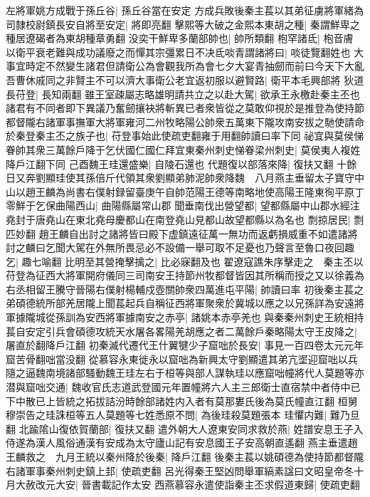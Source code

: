 左將軍姚方成戰于孫丘谷|{
	孫丘谷當在安定}
方成兵敗後秦主萇以其弟征虜將軍緒為司隸校尉鎮長安自將至安定|{
	將即亮翻}
擊熙等大破之金熙本東胡之種|{
	秦謂鮮卑之種居遼碣者為東胡種章勇翻}
没奕干鮮卑多蘭部帥也|{
	帥所類翻}
枹罕諸氐|{
	枹音膚}
以衛平衰老難與成功議廢之而憚其宗彊累日不决氐啖青謂諸將曰|{
	啖徒覽翻姓也}
大事宜時定不然變生諸君但請衛公為會觀我所為會七夕大宴青抽劒而前曰今天下大亂吾曹休戚同之非賢主不可以濟大事衛公老宜返初服以避賢路|{
	衛平本毛興部將}
狄道長苻登|{
	長知兩翻}
雖王室疎屬志略雄明請共立之以赴大駕|{
	欲承王永檄赴秦主丕也}
諸君有不同者即下異議乃奮劒攘袂將斬異已者衆皆從之莫敢仰視於是推登為使持節都督隴右諸軍事撫軍大將軍雍河二州牧略陽公帥衆五萬東下隴攻南安拔之馳使請命於秦登秦主丕之族子也|{
	苻登事始此使疏吏翻雍于用翻帥讀曰率下同}
祕宜與莫侯悌眷帥其衆三萬餘戶降于乞伏國仁國仁拜宜東秦州刺史悌眷梁州刺史|{
	莫侯夷人複姓降戶江翻下同}
己酉魏王珪還盛樂|{
	自陵石還也}
代題復以部落來降|{
	復扶又翻}
十餘日又奔劉顯珪使其孫倍斤代領其衆劉顯弟肺泥帥衆降魏　八月燕主垂留太子寶守中山以趙王麟為尚書右僕射録留臺庚午自帥范陽王德等南略地使高陽王隆東徇平原丁零鮮于乞保曲陽西山|{
	曲陽縣屬常山郡}
聞垂南伐出營望都|{
	望都縣屬中山郡水經注堯封于唐堯山在東北堯母慶都山在南登堯山見都山故望都縣以為名也}
剽掠居民|{
	剽匹妙翻}
趙王麟自出討之諸將皆曰殿下虚鎮遠征萬一無功而返虧損威重不如遣諸將討之麟曰乞聞大駕在外無所畏忌必不設備一舉可取不足憂也乃聲言至魯口夜回趣乞|{
	趣七喻翻}
比明至其營掩擊擒之|{
	比必寐翻及也}
翟遼寇譙朱序擊走之　秦主丕以苻登為征西大將軍開府儀同三司南安王持節州牧都督皆因其所稱而授之又以徐義為右丞相留王騰守晉陽右僕射楊輔戍壺關帥衆四萬進屯平陽|{
	帥讀曰率}
初後秦主萇之弟碩德統所部羌居隴上聞萇起兵自稱征西將軍聚衆於冀城以應之以兄孫詳為安遠將軍據隴城從孫訓為安西將軍據南安之赤亭|{
	諸姚本赤亭羌也}
與秦秦州刺史王統相持萇自安定引兵會碩德攻統天水屠各畧陽羌胡應之者二萬餘戶秦略陽太守王皮降之|{
	屠直於翻降戶江翻}
初秦滅代遷代王什翼犍少子窟咄於長安|{
	事見一百四卷太元元年窟苦骨翻咄當没翻}
從慕容永東徙永以窟咄為新興太守劉顯遣其弟亢埿迎窟咄以兵隨之逼魏南境諸部騷動魏王珪左右于桓等與部人謀執珪以應窟咄幢將代人莫題等亦潜與窟咄交通|{
	魏收官氏志道武登國元年置幢將六人主三郎衛士直宿禁中者侍中已下中散已上皆統之拓拔詰汾時餘部諸姓内入者有莫那婁氏後為莫氏幢直江翻}
桓舅穆崇告之珪誅桓等五人莫題等七姓悉原不問|{
	為後珪殺莫題張本}
珪懼内難|{
	難乃旦翻}
北踰隂山復依賀蘭部|{
	復扶又翻}
遣外朝大人遼東安同求救於燕|{
	姓譜安息王子入侍遂為漢人風俗通漢有安成為太守廬山記有安息國王子安高朝直遙翻}
燕主垂遣趙王麟救之　九月王統以秦州降於後秦|{
	降戶江翻}
後秦主萇以姚碩德為使持節都督隴右諸軍事秦州刺史鎮上邽|{
	使疏吏翻}
呂光得秦王堅凶問舉軍縞素諡曰文昭皇帝冬十月大赦改元大安|{
	晉書載記作太安}
西燕慕容永遣使詣秦主丕求假道東歸|{
	使疏吏翻}
